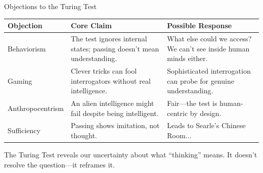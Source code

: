 ﻿\documentclass[aspectratio=169,11pt]{beamer}
\begin{document}
\begin{frame}{Objections to the Turing Test}
\begin{table}[h]
\centering
\scriptsize
\begin{tabular}{@{}p{2.5cm}p{4.5cm}p{5cm}@{}}
\toprule
\textbf{Objection} & \textbf{Core Claim} & \textbf{Possible Response} \\
\midrule
Behaviorism & The test ignores internal states; passing doesn't mean understanding. & What else could we access? We can't see inside human minds either. \\
\addlinespace
Gaming & Clever tricks can fool interrogators without real intelligence. & Sophisticated interrogation can probe for genuine understanding. \\
\addlinespace
Anthropocentrism & An alien intelligence might fail despite being intelligent. & Fair---the test is human-centric by design. \\
\addlinespace
Sufficiency & Passing shows imitation, not thought. & Leads to Searle's Chinese Room... \\
\bottomrule
\end{tabular}
\end{table}

\vspace{0.2em}
The Turing Test reveals our uncertainty about what ``thinking'' means. It doesn't resolve the question---it reframes it.
\end{frame}
\end{document}
